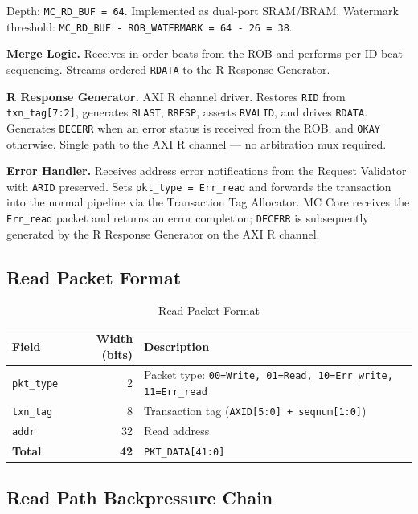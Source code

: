 \documentclass[11pt, a4paper]{article}
\begin{document}
Depth: \texttt{MC\_RD\_BUF = 64}. Implemented as dual-port SRAM/BRAM. Watermark threshold: \texttt{MC\_RD\_BUF - ROB\_WATERMARK = 64 - 26 = 38}.

\textbf{Merge Logic.}
Receives in-order beats from the ROB and performs per-ID beat sequencing. Streams ordered \texttt{RDATA} to the R Response Generator.

\textbf{R Response Generator.}
AXI R channel driver. Restores \texttt{RID} from \texttt{txn\_tag[7:2]}, generates \texttt{RLAST}, \texttt{RRESP}, asserts \texttt{RVALID}, and drives \texttt{RDATA}. Generates \texttt{DECERR} when an error status is received from the ROB, and \texttt{OKAY} otherwise. Single path to the AXI R channel — no arbitration mux required.

\textbf{Error Handler.}
Receives address error notifications from the Request Validator with \texttt{ARID} preserved. Sets \texttt{pkt\_type = Err\_read} and forwards the transaction into the normal pipeline via the Transaction Tag Allocator. MC Core receives the \texttt{Err\_read} packet and returns an error completion; \texttt{DECERR} is subsequently generated by the R Response Generator on the AXI R channel.

\subsection{Read Packet Format}

\begin{table}[h]
\centering
\begin{tabular}{lrl}
\toprule
\textbf{Field} & \textbf{Width (bits)} & \textbf{Description} \\
\midrule
\texttt{pkt\_type} & 2  & Packet type: \texttt{00=Write, 01=Read, 10=Err\_write, 11=Err\_read} \\
\texttt{txn\_tag}  & 8  & Transaction tag (\texttt{AXID[5:0] + seqnum[1:0]}) \\
\texttt{addr}      & 32 & Read address \\
\midrule
\textbf{Total}     & \textbf{42} & \texttt{PKT\_DATA[41:0]} \\
\bottomrule
\end{tabular}
\caption{Read Packet Format}
\end{table}

\subsection{Read Path Backpressure Chain}
\end{document}

